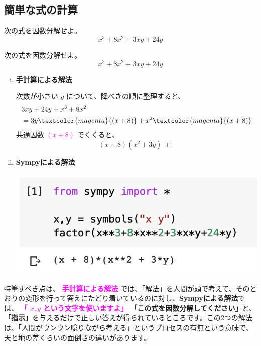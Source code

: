 \documentclass[9pt, a5paper,dvipdfmx]{jsbook}
\begin{document}
\subsection{簡単な式の計算}


\begin{tcolorbox}[colframe=magenta,
colback=magenta!20]
\begin{exq}
次の式を因数分解せよ。
\Large
$$x^3+8x^2+3xy+24y$$
\normalsize
\end{exq}
\end{tcolorbox}


\begin{framed}
\begin{exq}
次の式を因数分解せよ。
\Large
$$x^3+8x^2+3xy+24y$$
\normalsize
\end{exq}
\end{framed}

\begin{enumerate}[(i)]
    \item 
    {\bf 手計算による解法}
    
    次数が小さい
    \large
    $y$
    \normalsize
    について、降べきの順に整理すると、
    \large
    \begin{align*}
        &3xy+24y+x^3+8x^2\\
        &= 3y\textcolor{magenta}{(x+8)}+x^2\textcolor{magenta}{(x+8)}
    \end{align*}
    \normalsize
    共通因数 
    \large
    \textcolor{magenta}
    {$(x+8)$}
    \normalsize でくくると、
    \Large
    $$(x+8)(x^2+3y)\ \ \Box$$
    \normalsize
    \item
    
    {\bf Sympyによる解法}
    \begin{center}
    \includegraphics[scale=0.9]{fig1-2-1.png}
    \end{center}
\end{enumerate}
特筆すべき点は、 
\textcolor{magenta}
{\bf 手計算による解法}
では、「解法」を人間が頭で考えて、そのとおりの変形を行って答えにたどり着いているのに対し、{\bf Sympyによる解法}では、
\textcolor{magenta}
{\bf 「\large 
{$x, y$}
\normalsize
という文字を使いますよ」}
{\bf 「この式を因数分解してください」}と、{\bf「指示」}を与えるだけで正しい答えが得られているところです。この2つの解法は、「人間がウンウン唸りながら考える」というプロセスの有無という意味で、天と地の差くらいの面倒さの違いがあります。
\end{document}
